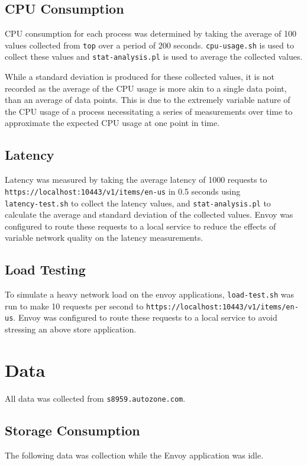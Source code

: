 \documentclass{article}
\begin{document}
\subsection{CPU Consumption}
CPU consumption for each process was determined by taking the average of 100 values collected from \texttt{top} over a period of 200 seconds. \texttt{cpu-usage.sh} is used to collect these values and \texttt{stat-analysis.pl} is used to average the collected values.

While a standard deviation is produced for these collected values, it is not recorded as the average of the CPU usage is more akin to a single data point, than an average of data points. This is due to the extremely variable nature of the CPU usage of a process necessitating a series of measurements over time to approximate the expected CPU usage at one point in time.

\subsection{Latency}
Latency was measured by taking the average latency of 1000 requests to\\
\texttt{https://localhost:10443/v1/items/en-us} in 0.5 seconds using\\
\texttt{latency-test.sh} to collect the latency values, and \texttt{stat-analysis.pl} to calculate the average and standard deviation of the collected values. Envoy was configured to route these requests to a local service to reduce the effects of variable network quality on the latency measurements.

\subsection{Load Testing}
To simulate a heavy network load on the envoy applications, \texttt{load-test.sh} was run to make 10 requests per second to \texttt{https://localhost:10443/v1/items/en-us}. Envoy was configured to route these requests to a local service to avoid stressing an above store application.

\section{Data}
All data was collected from \texttt{s8959.autozone.com}.

\subsection{Storage Consumption}
The following data was collection while the Envoy application was idle.
\end{document}
